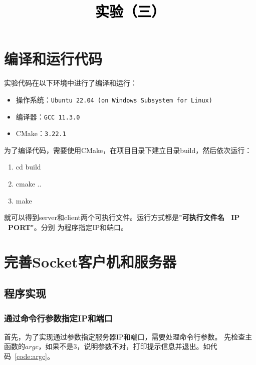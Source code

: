\documentclass[a4paper,twoside]{article}
\newcommand{\PaperTitle}{实验（三）}  %
\begin{document}
\newpage

\title{
	\Large{\textcolor{black}{\PaperTitle}}
}
	
	
\maketitle
	
\tableofcontents
 
\newpage
\setcounter{page}{1}

\begin{spacing}{1.2}

\section{编译和运行代码}

实验代码在以下环境中进行了编译和运行：

\begin{itemize}
	\item 操作系统：\texttt{Ubuntu 22.04 (on Windows Subsystem for Linux)}
	\item 编译器：\texttt{GCC 11.3.0}
	\item CMake：\texttt{3.22.1}
\end{itemize}

为了编译代码，需要使用CMake，在项目目录下建立目录build，然后依次运行：

\begin{enumerate}
	\item cd build 
	\item cmake .. 
	\item make 
\end{enumerate}

就可以得到server和client两个可执行文件。运行方式都是\textbf{"可执行文件名 \ IP \ PORT"}。分别
为程序指定IP和端口。

\section{完善Socket客户机和服务器}

\subsection{程序实现}

\subsubsection{通过命令行参数指定IP和端口}

首先，为了实现通过参数指定服务器IP和端口，需要处理命令行参数。
先检查主函数的$argc$，如果不是3，说明参数不对，打印提示信息并退出。如代码~\ref{code:argc}。


\end{spacing}
\end{document}
